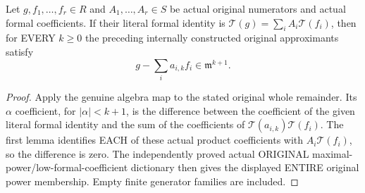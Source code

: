 \begin{theorem}
\label{hir:actual-formal-ideal-combination-original-jet-representatives}
\leanok
Let $g,f_1,\ldots,f_r\in R$ and $A_1,\ldots,A_r\in S$ be actual
original numerators and actual formal coefficients. If their literal
formal identity is $\mathcal T(g)=\sum_i A_i\mathcal T(f_i)$, then for
EVERY $k\ge0$ the preceding internally constructed original
approximants satisfy
\[
 g-\sum_i a_{i,k}f_i\in\mathfrak m^{k+1}.
\]
\end{theorem}
\begin{proof}
Apply the genuine algebra map to the stated original whole remainder.
Its $\alpha$ coefficient, for $|\alpha|<k+1$, is the difference between
the coefficient of the given literal formal identity and the sum of the
coefficients of $\mathcal T(a_{i,k})\mathcal T(f_i)$. The first lemma
identifies EACH of these actual product coefficients with
$A_i\mathcal T(f_i)$, so the difference is zero. The independently
proved actual ORIGINAL maximal-power/low-formal-coefficient dictionary
then gives the displayed ENTIRE original power membership. Empty finite
generator families are included.
\end{proof}


